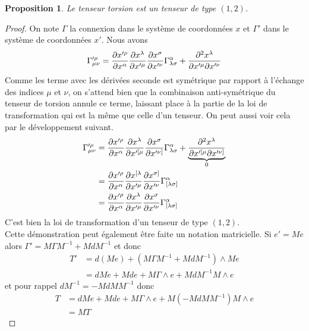 \documentclass[a4paper,11pt]{report}
\theoremstyle{definition}
\theoremstyle{plain}
\newtheorem{prop}[thm]{Proposition}
\theoremstyle{definition}
\theoremstyle{remark}
\begin{document}
                \begin{prop}
                    Le tenseur torsion est un tenseur de type $(1,2)$.
                \end{prop}
                
                \begin{proof}
                    On note $\Gamma$ la connexion dans le système de coordonnées $x$ et $\Gamma'$ dans le système de coordonnées $x'$. Nous avons
                    \begin{equation}
                        \Gamma'^\rho_{\mu\nu} = \pdv{x'^\rho}{x^\alpha}\pdv{x^\lambda}{x'^\mu}\pdv{x^\sigma}{x'^\nu}\Gamma^\alpha_{\lambda\sigma}+\pdv{x^\lambda}{x'^\mu}{x'^\nu}
                    \end{equation}
                    Comme les terme avec les dérivées seconde est symétrique par rapport à l'échange des indices $\mu$ et $\nu$, on s'attend bien que la combinaison anti-symétrique du tenseur de torsion annule ce terme, laissant place à la partie de la loi de transformation qui est la même que celle d'un tenseur. On peut aussi voir cela par le développement suivant.
                    \begin{align}
                        \Gamma'^\rho_{\mu\nu} &= \pdv{x'^\rho}{x^\alpha}\pdv{x^\lambda}{x'^{[\mu}}\pdv{x^\sigma}{x'^{\nu]}}\Gamma^\alpha_{\lambda\sigma}+\underbrace{\pdv{x^\lambda}{x'^{[\mu}}{x'^{\nu]}}}_{0}\\
                        &= \pdv{x'^\rho}{x^\alpha}\pdv{x^{[\lambda}}{x'^{\mu}}\pdv{x^{\sigma]}}{x'^{\nu}}\Gamma^\alpha_{[\lambda\sigma]}\\
                        &= \pdv{x'^\rho}{x^\alpha}\pdv{x^{\lambda}}{x'^{\mu}}\pdv{x^{\sigma}}{x'^{\nu}}\Gamma^\alpha_{[\lambda\sigma]}
                    \end{align}
                    C'est bien la loi de transformation d'un tenseur de type $(1,2)$.\\ Cette démonstration peut également être faite un notation matricielle. Si $e' = Me$ alors $\Gamma' = M\Gamma M^{-1}+MdM^{-1}$ et donc
                    \begin{align}
                        T' &= d(Me) + (M\Gamma M^{-1}+MdM^{-1})\wedge Me\\
                        &= dM e + Mde + M\Gamma\wedge e + MdM^{-1}M\wedge e
                    \end{align}
                    et pour rappel $dM^{-1} = -MdMM^{-1}$ donc
                    \begin{align}
                        T &= dM e + Mde + M\Gamma\wedge e + M(-MdMM^{-1})M\wedge e\\
                        &= MT
                    \end{align}
                \end{proof}
                
\end{document}
